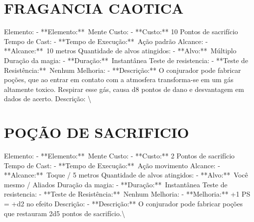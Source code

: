 \documentclass{article}%
\begin{document}
\section{FRAGANCIA CAOTICA}%
\label{sec:FRAGANCIACAOTICA}%
Elemento: {-} **Elemento:**~Mente\newline%
Custo: {-} **Custo:** 10 Pontos de sacrifício\newline%
Tempo de Cast: {-} **Tempo de Execução:**~Ação padrão\newline%
Alcance: {-} **Alcance:**~10 metros\newline%
Quantidade de alvos atingidos: {-} **Alvo:**~Múltiplo\newline%
Duração da magia: {-} **Duração:**~Instantânea\newline%
Teste de resistencia: {-} **Teste de Resistência:**~Nenhum\newline%
Melhoria: {-} **Descrição:** O conjurador pode fabricar poções, que ao entrar em contato com a atmosfera transforma{-}se em um gás altamente toxico. Respirar esse gás, causa d8 pontos de dano e desvantagem em dados de acerto.\newline%
Descrição: \textbackslash{}

%
\section{POÇÃO DE SACRIFICIO}%
\label{sec:POODESACRIFICIO}%
Elemento: {-} **Elemento:**~Mente\newline%
Custo: {-} **Custo:** 2 Pontos de sacrifício\newline%
Tempo de Cast: {-} **Tempo de Execução:**~Ação movimento\newline%
Alcance: {-} **Alcance:**~Toque / 5 metros\newline%
Quantidade de alvos atingidos: {-} **Alvo:**~Você mesmo / Aliados\newline%
Duração da magia: {-} **Duração:**~Instantânea\newline%
Teste de resistencia: {-} **Teste de Resistência:**~Nenhum\newline%
Melhoria: {-} **Melhoria:** +1 PS = +d2 no efeito\newline%
Descrição: {-} **Descrição:** O conjurador pode fabricar poções que restauram 2d5 pontos de sacrifício.\textbackslash{}

%
\end{document}
